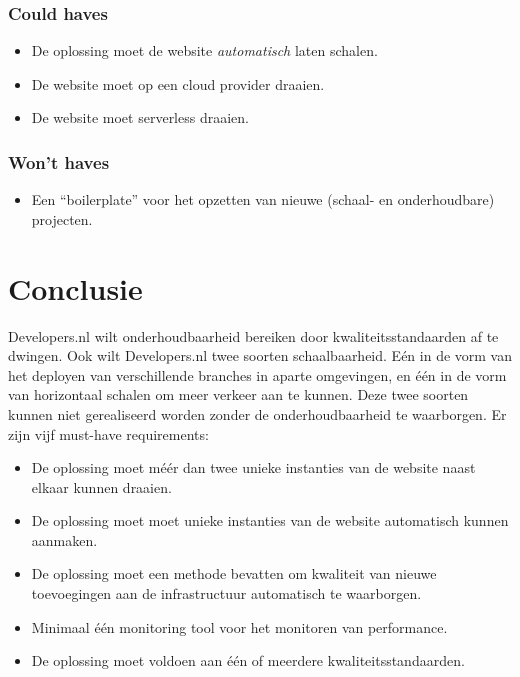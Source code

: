 \subsubsection{Could haves}
\begin{itemize}
	\item De oplossing moet de website \textit{automatisch} laten schalen.
	\item De website moet op een cloud provider draaien.
	\item De website moet serverless draaien.
\end{itemize}

\subsubsection{Won't haves}
\begin{itemize}
	\item Een \enquote{boilerplate} voor het opzetten van nieuwe (schaal- en onderhoudbare) projecten.
\end{itemize}

\section{Conclusie}
Developers.nl wilt onderhoudbaarheid bereiken door kwaliteitsstandaarden af te dwingen. Ook wilt Developers.nl twee soorten schaalbaarheid. Eén in de vorm van het deployen van verschillende branches in aparte omgevingen, en één in de vorm van horizontaal schalen om meer verkeer aan te kunnen. Deze twee soorten kunnen niet gerealiseerd worden zonder de onderhoudbaarheid te waarborgen. Er zijn vijf must-have requirements:

\begin{itemize}
	\item De oplossing moet méér dan twee unieke instanties van de website naast elkaar kunnen draaien.
	\item De oplossing moet moet unieke instanties van de website automatisch kunnen aanmaken.
	\item De oplossing moet een methode bevatten om kwaliteit van nieuwe toevoegingen aan de infrastructuur automatisch te waarborgen.
	\item Minimaal één monitoring tool voor het monitoren van performance.
	\item De oplossing moet voldoen aan één of meerdere kwaliteitsstandaarden.
\end{itemize}